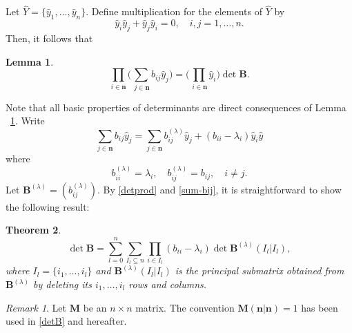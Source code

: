 \documentclass{article}
\newtheorem{thm}{Theorem}[section]
\newtheorem{lem}[thm]{Lemma}
\theoremstyle{definition}
\theoremstyle{remark}
\newtheorem{rem}{Remark}[section]
\newcommand{\wh}{\widehat}
\begin{document}
Let $\wh Y=\{\hat y_1,\dots,\hat y_n\}$. Define multiplication
for the elements of $\wh Y$ by
\begin{equation}
\hat y_i\hat y_j+\hat y_j\hat y_i=0,\quad i,j=1,\dots,n.
\end{equation}
Then, it follows that
\begin{lem}\label{lem-det}
\begin{equation}\label{detprod}
\prod_{i\in\mathbf{n}}
\biggl(\sum_{\,j\in\mathbf{n}}b_{ij}\hat y_j\biggr)
=\biggl(\prod_{\,i\in\mathbf{n}}\hat y_i\biggr)\det\mathbf{B}.
\end{equation}
\end{lem}

Note that all basic properties of determinants are direct consequences
of Lemma ~\ref{lem-det}. Write
\begin{equation}\label{sum-bij}
\sum_{j\in\mathbf{n}}b_{ij}\hat y_j=\sum_{j\in\mathbf{n}}b^{(\lambda)}
_{ij}\hat y_j+(b_{ii}-\lambda_i)\hat y_i\hat y
\end{equation}
where
\begin{equation}
b^{(\lambda)}_{ii}=\lambda_i,\quad b^{(\lambda)}_{ij}=b_{ij},
\quad i\not=j.
\end{equation}
Let $\mathbf{B}^{(\lambda)}=(b^{(\lambda)}_{ij})$. By \eqref{detprod}
and \eqref{sum-bij}, it is
straightforward to show the following
result:
\begin{thm}\label{thm-main}
\begin{equation}\label{detB}
\det\mathbf{B}=
\sum^n_{l =0}\sum_{I_l \subseteq n}
\prod_{i\in I_l}(b_{ii}-\lambda_i)
\det\mathbf{B}^{(\lambda)}(I_l |I_l ),
\end{equation}
where $I_l =\{i_1,\dots,i_l \}$ and $\mathbf{B}^{(\lambda)}(I_l |I_l )$
is the principal submatrix obtained from $\mathbf{B}^{(\lambda)}$
by deleting its $i_1,\dots,i_l $ rows and columns.
\end{thm}

\begin{rem}
Let $\mathbf{M}$ be an $n\times n$ matrix. The convention
$\mathbf{M}(\mathbf{n}|\mathbf{n})=1$ has been used in \eqref{detB} and
hereafter.
\end{rem}
\end{document}

